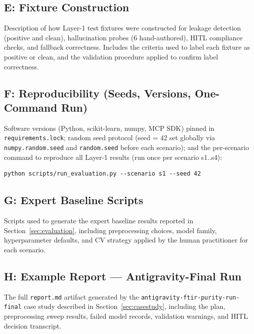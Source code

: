 \subsection*{E: Fixture Construction}
\label{app:fixtures}

Description of how Layer-1 test fixtures were constructed for leakage
detection (positive and clean), hallucination probes (6 hand-authored),
HITL compliance checks, and fallback correctness.
Includes the criteria used to label each fixture as positive or clean,
and the validation procedure applied to confirm label correctness.

\subsection*{F: Reproducibility (Seeds, Versions, One-Command Run)}
\label{app:reproducibility}

Software versions (Python, scikit-learn, numpy, MCP SDK) pinned in
\texttt{requirements.lock}; random seed protocol (seed = 42 set globally
via \texttt{numpy.random.seed} and \texttt{random.seed} before each
scenario); and the per-scenario command to reproduce all Layer-1 results
(run once per scenario s1..s4):
\begin{verbatim}
python scripts/run_evaluation.py --scenario s1 --seed 42
\end{verbatim}

\subsection*{G: Expert Baseline Scripts}
\label{app:expert_baselines}

Scripts used to generate the expert baseline results reported in
Section~\ref{sec:evaluation}, including preprocessing choices, model
family, hyperparameter defaults, and CV strategy applied by the human
practitioner for each scenario.

\subsection*{H: Example Report --- Antigravity-Final Run}
\label{app:example_report}

The full \texttt{report.md} artifact generated by the
\texttt{antigravity-ftir-purity-run-final} case study described in
Section~\ref{sec:casestudy}, including the plan, preprocessing sweep
results, failed model records, validation warnings, and HITL decision
transcript.
